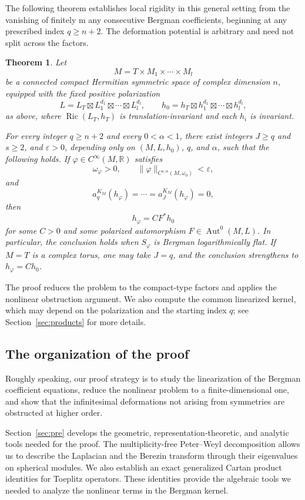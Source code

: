 \documentclass[11pt,reqno]{amsart}
\newtheorem{theorem}{Theorem}[section]
\theoremstyle{corollary}
\theoremstyle{conjecture}
\theoremstyle{assumption}
\theoremstyle{proposition}
\theoremstyle{remark}
\numberwithin{equation}{section}
\DeclareMathOperator{\Ric}{Ric}
\begin{document}
The following theorem establishes local rigidity in this general setting from the vanishing of finitely m any consecutive Bergman coefficients, beginning at any prescribed index $q\geq n+2$. The deformation potential is arbitrary and need not split across the factors. 

\begin{theorem}\label{thm:generalrigidity}
Let
\[
M=T\times M_1\times\cdots\times M_l
\]
be a connected compact Hermitian symmetric space of complex dimension $n$, equipped with the fixed positive polarization
\[
L=L_T\boxtimes L_1^{d_1}\boxtimes\cdots\boxtimes L_l^{d_l},\qquad h_0=h_T\boxtimes h_1^{d_1}\boxtimes\cdots\boxtimes h_l^{d_l},
\]
as above, where $\Ric(L_T,h_T)$ is translation-invariant and each $h_i$ is invariant. 

For every integer $q\geq n+2$ and every $0<\alpha<1$, there exist integers $J\geq q$ and $s\geq 2$, and $\varepsilon>0$, depending only on $(M,L,h_0)$, $q$, and $\alpha$, such that
the following holds. If $\varphi\in C^\infty(M,\mathbb R)$ satisfies
\[
\omega_\varphi>0,\qquad\|\varphi\|_{C^{s,\alpha}(M,\omega_0)}<\varepsilon,
\]
and
\[
a^{K_M}_q(h_\varphi)=\cdots=a^{K_M}_J(h_\varphi)=0,
\]
then
\[
h_\varphi=CF^*h_0
\]
for some $C>0$ and some polarized automorphism $F\in\operatorname{Aut}^0(M,L)$. In particular, the conclusion holds when $S_\varphi$ is Bergman logarithmically flat. If $M=T$ is a complex torus, one may take $J=q$, and the conclusion strengthens to $h_\varphi=Ch_0$.
\end{theorem}

The proof reduces the problem to the compact-type factors and applies the nonlinear obstruction argument. We also compute the common linearized kernel, which may depend on the polarization and the starting index $q$; see Section~\ref{sec:products} for more details.


\subsection{The organization of the proof}
Roughly speaking, our proof strategy is to study the linearization of the Bergman coefficient equations, reduce the nonlinear problem to a finite-dimensional one, and show that the infinitesimal deformations not arising from symmetries are obstructed at higher order.

Section~\ref{sec:pre} develops the geometric, representation-theoretic, and analytic tools needed for the proof. The multiplicity-free Peter--Weyl decomposition allows us to describe the Laplacian and the Berezin transform through their eigenvalues on spherical modules. We also establish an exact generalized Cartan product identities for Toeplitz operators. These identities provide the algebraic tools we needed to analyze the nonlinear terms in the Bergman kernel.
\end{document}
